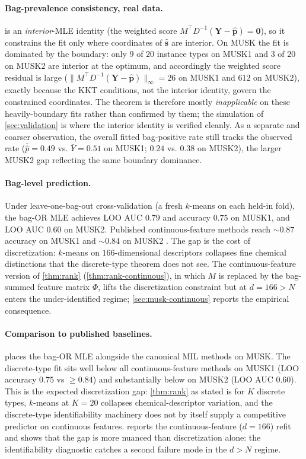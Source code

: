 \paragraph{Bag-prevalence consistency, real data.} 
is an \emph{interior}-MLE identity (the weighted score $M^\top
D^{-1}(\bm Y - \hat{\bm p}) = \bm 0$), so it constrains the fit only
where coordinates of $\hat{\bm s}$ are interior. On MUSK the fit is
dominated by the boundary: only $9$ of $20$ instance types on MUSK1
and $3$ of $20$ on MUSK2 are interior at the optimum, and
accordingly the weighted score residual is large
($\|M^\top D^{-1}(\bm Y - \hat{\bm p})\|_\infty = 26$ on MUSK1 and
$612$ on MUSK2), exactly because the KKT conditions, not the
interior identity, govern the constrained coordinates. The theorem
is therefore mostly \emph{inapplicable} on these heavily-boundary
fits rather than confirmed by them; the simulation of
\cref{sec:validation} is where the interior identity is verified
cleanly. As a separate and coarser observation, the overall fitted
bag-positive rate still tracks the observed rate ($\bar{\hat p} =
0.49$ vs. $\bar Y = 0.51$ on MUSK1; $0.24$ vs. $0.38$ on MUSK2),
the larger MUSK2 gap reflecting the same boundary dominance.

\paragraph{Bag-level prediction.} Under leave-one-bag-out
cross-validation (a fresh $k$-means on each held-in fold), the
bag-OR MLE achieves LOO AUC $0.79$ and accuracy $0.75$ on MUSK1, and
LOO AUC $0.60$ on MUSK2. Published continuous-feature methods
reach $\sim 0.87$ accuracy on MUSK1 \citep{andrews2003support} and
$\sim 0.84$ on MUSK2 \citep{maron1998framework}. The gap is the
cost of discretization: $k$-means on $166$-dimensional descriptors
collapses fine chemical distinctions that the discrete-type
theorem does not see. The continuous-feature version of
\cref{thm:rank} (\cref{thm:rank-continuous}), in which $M$ is
replaced by the bag-summed feature matrix $\Phi$, lifts the
discretization constraint but at $d = 166 > N$ enters the
under-identified regime; \cref{sec:musk-continuous} reports the
empirical consequence.

\paragraph{Comparison to published baselines.}
 places the bag-OR MLE alongside the
canonical MIL methods on MUSK. The discrete-type fit sits well
below all continuous-feature methods on MUSK1 (LOO accuracy $0.75$
vs $\geq 0.84$) and substantially below on MUSK2 (LOO AUC $0.60$).
This is the expected discretization gap: \cref{thm:rank} as stated
is for $K$ discrete types, $k$-means at $K = 20$ collapses
chemical-descriptor variation, and the discrete-type
identifiability machinery does not by itself supply a competitive
predictor on continuous features. 
reports the continuous-feature ($d = 166$) refit and shows that
the gap is more nuanced than discretization alone: the
identifiability diagnostic catches a second failure mode in the
$d > N$ regime.

